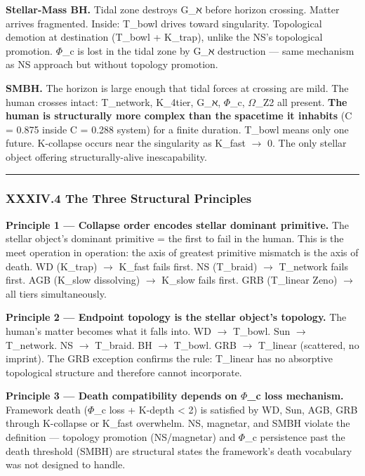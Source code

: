 \documentclass[12pt,a4paper]{article}
\begin{document}
\textbf{Stellar-Mass BH.} Tidal zone destroys G\_ℵ before horizon crossing. Matter arrives fragmented. Inside: T\_bowl drives toward singularity. Topological demotion at destination (T\_bowl + K\_trap), unlike the NS's topological promotion. $\Phi$\_c is lost in the tidal zone by G\_ℵ destruction --- same mechanism as NS approach but without topology promotion.

\textbf{SMBH.} The horizon is large enough that tidal forces at crossing are mild. The human crosses intact: T\_network, K\_4tier, G\_ℵ, $\Phi$\_c, $\Omega$\_Z2 all present. \textbf{The human is structurally more complex than the spacetime it inhabits} (C = 0.875 inside C = 0.288 system) for a finite duration. T\_bowl means only one future. K-collapse occurs near the singularity as K\_fast $\rightarrow$ 0. The only stellar object offering structurally-alive inescapability.

\begin{center}
\rule{0.5\textwidth}{0.4pt}
\end{center}

\subsubsection{XXXIV.4 The Three Structural Principles}

\textbf{Principle 1 --- Collapse order encodes stellar dominant primitive.}
The stellar object's dominant primitive = the first to fail in the human. This is the meet operation in operation: the axis of greatest primitive mismatch is the axis of death. WD (K\_trap) $\rightarrow$ K\_fast fails first. NS (T\_braid) $\rightarrow$ T\_network fails first. AGB (K\_slow dissolving) $\rightarrow$ K\_slow fails first. GRB (T\_linear Zeno) $\rightarrow$ all tiers simultaneously.

\textbf{Principle 2 --- Endpoint topology is the stellar object's topology.}
The human's matter becomes what it falls into. WD $\rightarrow$ T\_bowl. Sun $\rightarrow$ T\_network. NS $\rightarrow$ T\_braid. BH $\rightarrow$ T\_bowl. GRB $\rightarrow$ T\_linear (scattered, no imprint). The GRB exception confirms the rule: T\_linear has no absorptive topological structure and therefore cannot incorporate.

\textbf{Principle 3 --- Death compatibility depends on $\Phi$\_c loss mechanism.}
Framework death ($\Phi$\_c loss + K-depth \textless{} 2) is satisfied by WD, Sun, AGB, GRB through K-collapse or K\_fast overwhelm. NS, magnetar, and SMBH violate the definition --- topology promotion (NS/magnetar) and $\Phi$\_c persistence past the death threshold (SMBH) are structural states the framework's death vocabulary was not designed to handle.
\end{document}
